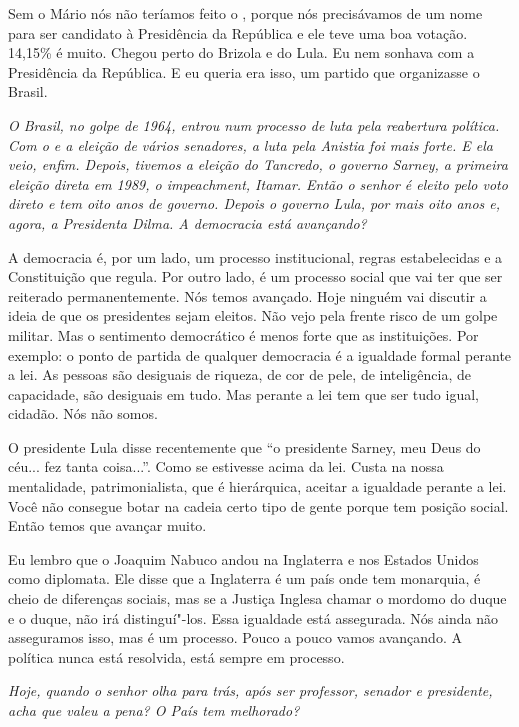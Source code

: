 Sem o Mário nós não teríamos feito o , porque nós precisávamos de um
nome para ser candidato à Presidência da República e ele teve uma boa
votação. 14,15\% é muito. Chegou perto do Brizola e do Lula. Eu nem
sonhava com a Presidência da República. E eu queria era isso, um partido
que organizasse o Brasil.

\medskip

\emph{O Brasil, no golpe de 1964, entrou num processo de luta pela
reabertura política. Com o  e a eleição de vários senadores, a luta
pela Anistia foi mais forte. E ela veio, enfim. Depois, tivemos a
eleição do Tancredo, o governo Sarney, a primeira eleição direta em
1989, o impeachment, Itamar. Então o senhor é eleito pelo voto direto e
tem oito anos de governo. Depois o governo Lula, por mais oito anos e,
agora, a Presidenta Dilma. A democracia está avançando?}

A democracia é, por um lado, um processo institucional,
regras estabelecidas e a Constituição que regula. Por outro lado, é um
processo social que vai ter que ser reiterado permanentemente. Nós temos
avançado. Hoje ninguém vai discutir a ideia de que os presidentes sejam
eleitos. Não vejo pela frente risco de um golpe militar. Mas o
sentimento democrático é menos forte que as instituições. Por exemplo: o
ponto de partida de qualquer democracia é a igualdade formal perante a
lei. As pessoas são desiguais de riqueza, de cor de pele, de
inteligência, de capacidade, são desiguais em tudo. Mas perante a lei
tem que ser tudo igual, cidadão. Nós não somos.

O presidente Lula disse recentemente que ``o presidente Sarney, meu Deus
do céu... fez tanta coisa...''. Como se estivesse acima da lei. Custa na
nossa mentalidade, patrimonialista, que é hierárquica, aceitar a
igualdade perante a lei. Você não consegue botar na cadeia certo tipo de
gente porque tem posição social. Então temos que avançar muito.

Eu lembro que o Joaquim Nabuco andou na Inglaterra e nos Estados Unidos
como diplomata. Ele disse que a Inglaterra é um país onde tem monarquia,
é cheio de diferenças sociais, mas se a Justiça Inglesa chamar o mordomo
do duque e o duque, não irá distinguí"-los. Essa igualdade está
assegurada. Nós ainda não asseguramos isso, mas é um processo. Pouco a
pouco vamos avançando. A política nunca está resolvida, está sempre em
processo.

\medskip

\emph{Hoje, quando o senhor olha para trás, após ser professor,
senador e presidente, acha que valeu a pena? O País tem melhorado?}

